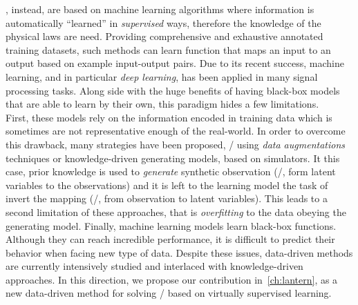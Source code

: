 , instead, are based on machine learning algorithms where information is automatically ``learned'' in \textit{supervised} ways, therefore the knowledge of the physical laws are need.
Providing comprehensive and exhaustive annotated training datasets, such methods can learn function that maps an input to an output based on example input-output pairs.
Due to its recent success, machine learning, and in particular \textit{deep learning}, has been applied in many signal processing tasks.
Along side with the huge benefits of having black-box models that are able to learn by their own, this paradigm hides a few limitations.
\\First, these models rely on the information encoded in training data which is sometimes are not representative enough of the real-world.
In order to overcome this drawback, many strategies have been proposed, \eg/ using\textit{ data augmentations} techniques or knowledge-driven generating models, based on simulators.
It this case, prior knowledge is used to \textit{generate} synthetic observation (\ie/, form latent variables to the observations) and
it is left to the learning model the task of invert the mapping (\ie/, from observation to latent variables).
This leads to a second limitation of these approaches, that is \textit{overfitting} to the data obeying the generating model.
Finally, machine learning models learn black-box functions.
Although they can reach incredible performance, it is difficult to predict their behavior when facing new type of data.
Despite these issues, data-driven methods are currently intensively studied and interlaced with knowledge-driven approaches.
In this direction, we propose our contribution in~\cref{ch:lantern}, as a new data-driven method for solving \AER/ based on virtually supervised learning.